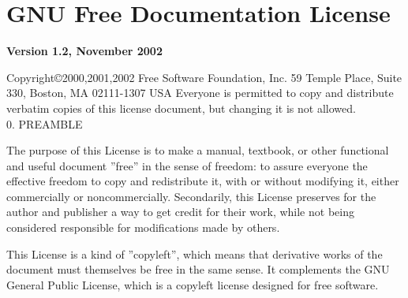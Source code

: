 

\section*{GNU Free Documentation License} 

{\bf Version 1.2, November 2002}\par


Copyright\copyright2000,2001,2002  Free Software Foundation, Inc. 59 Temple Place, Suite 330, Boston, MA  02111-1307
USA Everyone is permitted to copy and distribute verbatim copies of this license document, but changing it is not
allowed.
\\

0. PREAMBLE

The purpose of this License is to make a manual, textbook, or other functional and useful document ''free'' in the
sense of freedom: to assure everyone the effective freedom to copy and redistribute it, with or without modifying it,
either commercially or noncommercially. Secondarily, this License preserves for the author and publisher a way to get
credit for their work, while not being considered responsible for modifications made by others.

This License is a kind of ''copyleft'', which means that derivative works of the document must themselves be free in
the same sense. It complements the GNU General Public License, which is a copyleft license designed for free software.

